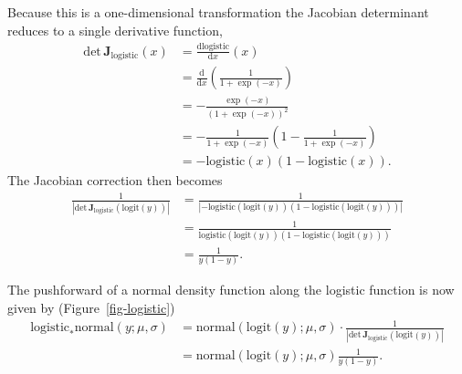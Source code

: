 \documentclass[
  letterpaper,
  DIV=11,
  numbers=noendperiod]{scrartcl}
\begin{document}
Because this is a one-dimensional transformation the Jacobian
determinant reduces to a single derivative function, \begin{align*}
\mathrm{det} \, \mathbf{J}_{\text{logistic}}(x)
&=
\frac{ \mathrm{d} \text{logistic} }{ \mathrm{d} x }(x)
\\
&=
\frac{ \mathrm{d} }{ \mathrm{d} x } \left( \frac{1}{1 + \exp(-x)} \right)
\\
&=
- \frac{\exp(-x)}{(1 + \exp(-x))^{2}}
\\
&=
- \frac{1}{1 + \exp(-x)} \left(1 - \frac{1}{1 + \exp(-x)} \right)
\\
&=
- \text{logistic}(x) \left(1 - \text{logistic}(x) \right).
\end{align*} The Jacobian correction then becomes \begin{align*}
\frac{1}{| \mathrm{det} \, \mathbf{J}_{\text{logistic}}(\text{logit}(y)) |}
&=
\frac{1}{ | - \text{logistic}(\text{logit}(y))
              \left(1 - \text{logistic}(\text{logit}(y)) \right) | }
\\
&=
\frac{1}{ \text{logistic}(\text{logit}(y))
          \left(1 - \text{logistic}(\text{logit}(y)) \right) }
\\
&=
\frac{1}{ y \left(1 - y \right) }.
\end{align*}

The pushforward of a normal density function along the logistic function
is now given by (Figure~\ref{fig-logistic}) \begin{align*}
\text{logistic}_{*} \mathrm{normal}(y; \mu, \sigma)
&=
\mathrm{normal}( \text{logit}(y); \mu, \sigma)
\cdot \frac{1}{| \mathrm{det} \, \mathbf{J}_{\text{logistic}}(\text{logit}(y)) |}
\\
&=
\mathrm{normal}( \text{logit}(y); \mu, \sigma) \frac{1}{y(1 - y)}.
\end{align*}
\end{document}
